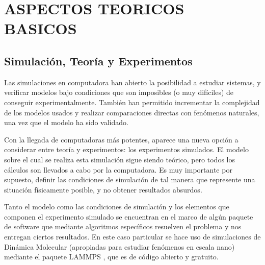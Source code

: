 
\chapter{ASPECTOS TEORICOS BASICOS} %

\label{C2} %



\section{Simulación, Teoría y Experimentos}
\label{S2_1}

Las simulaciones en computadora han abierto la posibilidad a estudiar sistemas, y verificar modelos bajo condiciones que son imposibles (o muy difíciles) de conseguir experimentalmente. También han permitido incrementar la complejidad de los modelos usados y realizar comparaciones directas con fenómenos naturales, una vez que el modelo ha sido validado.

Con la llegada de computadoras más potentes, aparece una nueva opción a considerar entre teoría y experimentos: los experimentos simulados. El modelo sobre el cual se realiza esta simulación sigue siendo teórico, pero todos los cálculos son llevados a cabo por la computadora. Es muy importante por supuesto, definir las condiciones de simulación de tal manera que represente una situación físicamente posible, y no obtener resultados absurdos.

Tanto el modelo como las condiciones de simulación y los elementos que componen el experimento simulado se encuentran en el marco de algún paquete de software que mediante algoritmos específicos resuelven el problema y nos entregan ciertos resultados. En este caso particular se hace uso de simulaciones de Dinámica Molecular (apropiadas para estudiar fenómenos en escala nano) mediante el paquete LAMMPS \cite{plimpton95}, que es de código abierto y gratuito.


